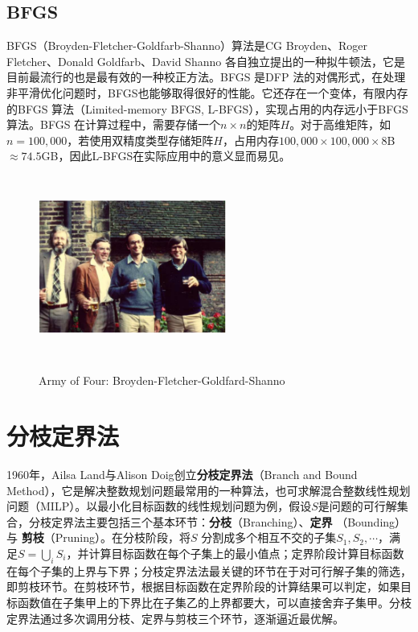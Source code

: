\subsection{BFGS}
BFGS（Broyden-Fletcher-Goldfarb-Shanno）算法是CG Broyden\cite{broyden1967quasi}、Roger Fletcher\cite{fletcher1970new}、Donald Goldfarb\cite{goldfarb1970family}、David Shanno\cite{shanno1970conditioning} 各自独立提出的一种拟牛顿法，它是目前最流行的也是最有效的一种校正方法。BFGS 是DFP 法的对偶形式，在处理非平滑优化问题时，BFGS也能够取得很好的性能。它还存在一个变体，有限内存的BFGS 算法（Limited-memory BFGS, L-BFGS），实现占用的内存远小于BFGS 算法。BFGS 在计算过程中，需要存储一个$n\times n$的矩阵$H$。对于高维矩阵，如$n=100,000$，若使用双精度类型存储矩阵$H$，占用内存$100,000\times 100,000 \times 8$B$\approx 74.5$GB，因此L-BFGS在实际应用中的意义显而易见。
\begin{figure}[htbp]
  \centering
  \includegraphics[width=0.55\textwidth,height=6cm]{figures/scientists/bfgs.eps}\\
  \caption{Army of Four: Broyden-Fletcher-Goldfard-Shanno}\label{fig:bfgs}
\end{figure}

\section{分枝定界法}
1960年，Ailsa Land与Alison Doig\cite{land1960automatic}创立\textbf{分枝定界法}（Branch and Bound Method），它是解决整数规划问题最常用的一种算法，也可求解混合整数线性规划问题（MILP）。以最小化目标函数的线性规划问题为例，假设$S$是问题的可行解集合，分枝定界法主要包括三个基本环节：\textbf{分枝}（Branching）、\textbf{定界}
（Bounding）与 \textbf{剪枝}（Pruning）。在分枝阶段，将$S$ 分割成多个相互不交的子集$S_1,S_2,\cdots$，满足$S=\mathop\bigcup\limits_i S_i$，并计算目标函数在每个子集上的最小值点；定界阶段计算目标函数在每个子集的上界与下界；分枝定界法法最关键的环节在于对可行解子集的筛选，即剪枝环节。在剪枝环节，根据目标函数在定界阶段的计算结果可以判定，如果目标函数值在子集甲上的下界比在子集乙的上界都要大，可以直接舍弃子集甲。分枝定界法通过多次调用分枝、定界与剪枝三个环节，逐渐逼近最优解。

